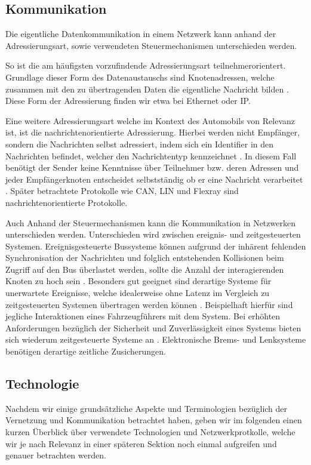     \subsection{Kommunikation}
    Die eigentliche Datenkommunikation in einem Netzwerk kann anhand der Adressierungsart, sowie verwendeten Steuermechanismen unterschieden werden. 
    
    So ist die am häufigsten vorzufindende Adressierungsart teilnehmerorientert. Grundlage dieser Form des Datenaustauschs sind Knotenadressen, welche zusammen mit den
    zu übertragenden Daten die eigentliche Nachricht bilden \cite{reif2011bosch}. Diese Form der Adressierung finden wir etwa bei Ethernet oder IP. 
    
    Eine weitere Adressierungsart welche im Kontext des Automobils von Relevanz ist, ist die nachrichtenorientierte Adressierung. Hierbei werden nicht Empfänger, sondern die Nachrichten selbst
    adressiert, indem sich ein Identifier in den Nachrichten befindet, welcher den Nachrichtentyp kennzeichnet \cite{reif2011bosch}. In diesem Fall benötigt der Sender keine 
    Kenntnisse über Teilnehmer bzw. deren Adressen und jeder Empfängerknoten entscheidet selbstständig ob er eine Nachricht verarbeitet \cite{reif2011bosch}. Später betrachtete
    Protokolle wie CAN, LIN und Flexray sind nachrichtenorientierte Protokolle.

    Auch Anhand der Steuermechanismen kann die Kommunikation in Netzwerken unterschieden werden. Unterschieden wird zwischen ereignis- und zeitgesteuerten Systemen.
    Ereignisgesteuerte Bussysteme können aufgrund der inhärent fehlenden Synchronisation der Nachrichten und folglich entstehenden Kollisionen beim Zugriff auf den Bus
    überlastet werden, sollte die Anzahl der interagierenden Knoten zu hoch sein \cite{reif2011bosch}. Besonders gut geeignet sind derartige Systeme für unerwartete Ereignisse,
    welche idealerweise ohne Latenz im Vergleich zu zeitgesteuerten Systemen übertragen werden können \cite{reif2011bosch}. Beispielhaft hierfür sind jegliche Interaktionen eines 
    Fahrzeugführers mit dem System. Bei erhöhten Anforderungen bezüglich der Sicherheit und Zuverlässigkeit eines Systems bieten sich wiederum zeitgesteuerte Systeme an \cite{reif2011bosch}.
    Elektronische Brems- und Lenksysteme benötigen derartige zeitliche Zusicherungen.
    \subsection{Technologie}
    Nachdem wir einige grundsätzliche Aspekte und Terminologien bezüglich der Vernetzung und Kommunikation betrachtet haben, geben wir im folgenden einen kurzen Überblick
    über verwendete Technologien und Netzwerkprotkolle, welche wir je nach Relevanz in einer späteren Sektion noch einmal aufgreifen und genauer betrachten werden.
